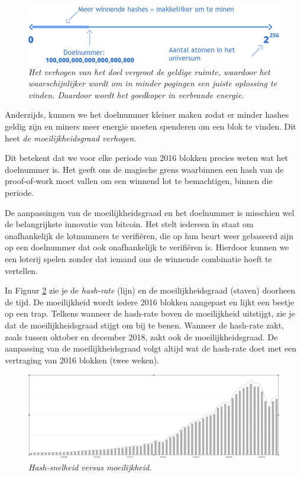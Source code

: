 \documentclass[smalldemyvopaper,11pt,twoside,onecolumn,openright,extrafontsizes]{memoir}
\begin{document}
\begin{figure}
    \centering
    \includegraphics[width=\textwidth]{images/fig8.png}
    \caption{\footnotesize{\textit{Het verhogen van het doel vergroot de geldige ruimte, waardoor het waarschijnlijker wordt om in minder pogingen een juiste oplossing te vinden. Daardoor wordt het goedkoper in verbrande \mbox{energie.}}}}
    \label{fig9}
\end{figure}



Anderzijds, kunnen we het doelnummer kleiner maken zodat er minder hashes geldig zijn en miners meer energie moeten spenderen om een blok te vinden. Dit heet \textit{de moeilijkheidsgraad verhogen}.

Dit betekent dat we voor elke periode van 2016 blokken precies weten wat het doelnummer is. Het geeft ons de magische grens waarbinnen een hash van de proof-of-work moet vallen om een winnend lot te bemachtigen, binnen die periode.

De aanpassingen van de moeilijkheidsgraad en het doelnummer is misschien wel de belangrijkste innovatie van bitcoin. Het stelt iedereen in staat om onafhankelijk de lotnummers te verifiëren, die op hun beurt weer gebaseerd zijn op een doelnummer dat ook onafhankelijk te verifiëren is. Hierdoor kunnen we een loterij spelen zonder dat iemand ons de winnende combinatie hoeft te vertellen.



In Figuur \ref{fig10} zie je de \textit{hash-rate} (lijn) en de moeilijkheidsgraad (staven) doorheen de tijd. De moeilijkheid wordt iedere 2016 blokken aangepast en lijkt een beetje op een trap. Telkens wanneer de hash-rate boven de moeilijkheid uitstijgt, zie je dat de moeilijkheidsgraad stijgt om bij te benen. Wanneer de hash-rate zakt, zoals tussen oktober en december 2018, zakt ook de moeilijkheidsgraad. De aanpassing van de moeilijkheidsgraad volgt altijd wat de hash-rate doet met een vertraging van 2016 blokken (twee weken).

\begin{figure}
    \centering
    \includegraphics[width=\textwidth]{images/fig10.png}
    \caption{\footnotesize{\textit{Hash-snelheid versus moeilijkheid.}}}
    \label{fig10}
\end{figure}
\end{document}
